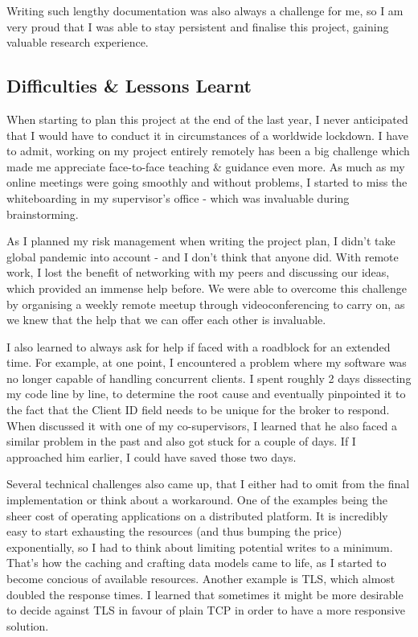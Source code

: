 Writing such lengthy documentation was also always a challenge for me, so I am very proud that I was able to stay persistent and finalise this project, gaining valuable research experience.

\subsection{Difficulties \& Lessons Learnt}
When starting to plan this project at the end of the last year, I never anticipated that I would have to conduct it in circumstances of a worldwide lockdown. I have to admit, working on my project entirely remotely has been a big challenge which made me appreciate face-to-face teaching \& guidance even more. As much as my online meetings were going smoothly and without problems, I started to miss the whiteboarding in my supervisor's office - which was invaluable during brainstorming.

As I planned my risk management when writing the project plan, I didn't take global pandemic into account - and I don't think that anyone did. With remote work, I lost the benefit of networking with my peers and discussing our ideas, which provided an immense help before. We were able to overcome this challenge by organising a weekly remote meetup through videoconferencing to carry on, as we knew that the help that we can offer each other is invaluable.

I also learned to always ask for help if faced with a roadblock for an extended time. For example, at one point, I encountered a problem where my software was no longer capable of handling concurrent clients. I spent roughly 2 days dissecting my code line by line, to determine the root cause and eventually pinpointed it to the fact that the Client ID field needs to be unique for the broker to respond. When discussed it with one of my co-supervisors, I learned that he also faced a similar problem in the past and also got stuck for a couple of days. If I approached him earlier, I could have saved those two days.

Several technical challenges also came up, that I either had to omit from the final implementation or think about a workaround. One of the examples being the sheer cost of operating applications on a distributed platform. It is incredibly easy to start exhausting the resources (and thus bumping the price) exponentially, so I had to think about limiting potential writes to a minimum. That's how the caching and crafting data models came to life, as I started to become concious of available resources. Another example is TLS, which almost doubled the response times. I learned that sometimes it might be more desirable to decide against TLS in favour of plain TCP in order to have a more responsive solution.

